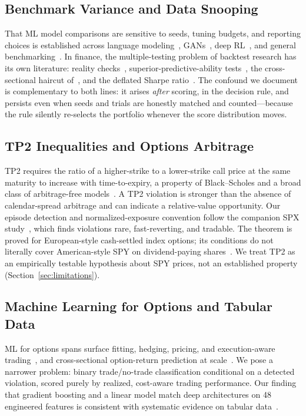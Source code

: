 \documentclass[sigconf,review]{acmart}
\begin{document}
\subsection{Benchmark Variance and Data Snooping}
That ML model comparisons are sensitive to seeds, tuning budgets, and reporting choices is established across language modeling~\cite{melis2018state}, GANs~\cite{lucic2018gans}, deep RL~\cite{agarwal2021deep}, and general benchmarking~\cite{bouthillier2021accounting,dodge2019show}. In finance, the multiple-testing problem of backtest research has its own literature: reality checks~\cite{white2000reality}, superior-predictive-ability tests~\cite{hansen2005spa}, the cross-sectional haircut of~\cite{harvey2016crosssection}, and the deflated Sharpe ratio~\cite{bailey2014deflated}. The confound we document is complementary to both lines: it arises \emph{after} scoring, in the decision rule, and persists even when seeds and trials are honestly matched and counted---because the rule silently re-selects the portfolio whenever the score distribution moves.

\subsection{TP2 Inequalities and Options Arbitrage}
TP2 requires the ratio of a higher-strike to a lower-strike call price at the same maturity to increase with time-to-expiry, a property of Black--Scholes and a broad class of arbitrage-free models~\cite{glasserman2026tp2theory,glasserman2023convexity}. A TP2 violation is stronger than the absence of calendar-spread arbitrage and can indicate a relative-value opportunity. Our episode detection and normalized-exposure convention follow the companion SPX study~\cite{glasserman2025tp2}, which finds violations rare, fast-reverting, and tradable. The theorem is proved for European-style cash-settled index options; its conditions do not literally cover American-style SPY on dividend-paying shares~\cite{cosma2020earlyexercise}. We treat TP2 as an empirically testable hypothesis about SPY prices, not an established property (Section~\ref{sec:limitations}).

\subsection{Machine Learning for Options and Tabular Data}
ML for options spans surface fitting, hedging, pricing, and execution-aware trading~\cite{kearns2013mlmicrostructure}, and cross-sectional option-return prediction at scale~\cite{bali2023option}. We pose a narrower problem: binary trade/no-trade classification conditional on a detected violation, scored purely by realized, cost-aware trading performance. Our finding that gradient boosting and a linear model match deep architectures on 48 engineered features is consistent with systematic evidence on tabular data~\cite{grinsztajn2022why,shwartzziv2022tabular,gorishniy2021revisiting}.
\end{document}
